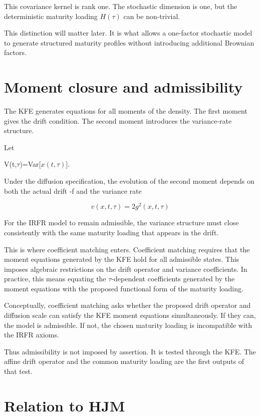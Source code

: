 \documentclass[11pt,oneside]{book}
\begin{document}
This covariance kernel is rank one. The stochastic dimension is one, but
the deterministic maturity loading $H(\tau)$ can be non-trivial.

This distinction will matter later. It is what allows a one-factor
stochastic model to generate structured maturity profiles without
introducing additional Brownian factors.

\section{Moment closure and
admissibility}\label{moment-closure-and-admissibility}

The KFE generates equations for all moments of the density. The first
moment gives the drift condition. The second moment introduces the
variance-rate structure.

Let

V(t,$\tau$)=Var[$x(t,\tau)$].

Under the diffusion specification, the evolution of the second moment
depends on both the actual drift -f and the variance rate

\[
v(x,t,\tau)=2g^2(x,t,\tau)
\]

For the IRFR model to remain admissible, the variance structure must
close consistently with the same maturity loading that appears in the
drift.

This is where coefficient matching enters. Coefficient matching requires
that the moment equations generated by the KFE hold for all admissible
states. This imposes algebraic restrictions on the drift operator and
variance coefficients. In practice, this means equating the $\tau$-dependent
coefficients generated by the moment equations with the proposed
functional form of the maturity loading.

Conceptually, coefficient matching asks whether the proposed drift
operator and diffusion scale can satisfy the KFE moment equations
simultaneously. If they can, the model is admissible. If not, the chosen
maturity loading is incompatible with the IRFR axioms.

Thus admissibility is not imposed by assertion. It is tested through the
KFE. The affine drift operator and the common maturity loading are the
first outputs of that test.

\section{Relation to HJM}\label{relation-to-hjm}
\end{document}
